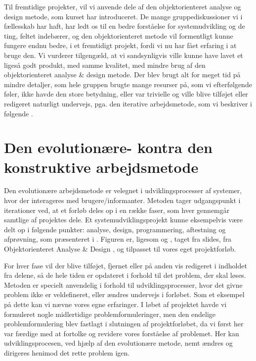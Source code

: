 Til fremtidige projekter, vil vi anvende dele af den objektorienteret analyse og design metode, som kurset har introduceret. De mange gruppediskussioner vi i fællesskab har haft, har ledt os til en bedre forståelse for systemudvikling og de ting, feltet indebærer, og den objektorienteret metode vil formentligt kunne fungere endnu bedre, i et fremtidigt projekt, fordi vi nu har fået erfaring i at bruge den. Vi vurderer tilgengæld, at vi sandsynligvis ville kunne have lavet et ligeså godt produkt, med samme kvalitet, med mindre brug af den objektorienteret analyse \& design metode. Der blev brugt alt for meget tid på mindre detaljer, som hele gruppen brugte mange resurser på, som vi efterfølgende føler, ikke havde den store betydning, eller var trivielle og ville blive tilføjet eller redigeret naturligt undervejs, pga. den iterative arbejdsmetode, som vi beskriver i følgende .


\section{Den evolutionære- kontra den konstruktive arbejdsmetode}
\label{sec:akadmiskevolutionaeremetode}

Den evolutionære arbejdsmetode er velegnet i udviklingsprocesser af systemer, hvor der interageres med brugere/informanter. 
Metoden tager udgangspunkt i iterationer ved, at et forløb deles op i en række faser, som hver gennemgår samtlige af projektes dele. Et systemudviklingsprojekt kunne eksempelvis være delt op i følgende punkter: analyse, design, programmering, aftestning og afprøvning, som præsenteret i . Figuren er, ligesom  og , taget fra slides, fra Objektorienteret Analyse \& Design \cite{ooadslide}, og tilpasset til vores eget projektforløb.

For hver fase vil der blive tilføjet, fjernet eller på anden vis redigeret i indholdet fra delene, så de hele tiden er opdateret i forhold til det problem, der skal løses. 
Metoden er specielt anvendelig i forhold til udviklingsprocesser, hvor det givne problem ikke er veldefineret, eller ændres undervejs i forløbet. 
Som et eksempel på dette kan vi nævne vores egne erfaringer. I løbet af projektet havde vi formuleret nogle midlertidige problemformuleringer, men den endelige problemformulering blev fastlagt i slutningen af projektforløbet, da vi først her var færdige med at fortolke og revidere vores forståelse af problemet.
Her kan udviklingsprocesen, ved hjælp af den evolutionære metode, nemt ændres og dirigeres henimod det rette problem igen.

